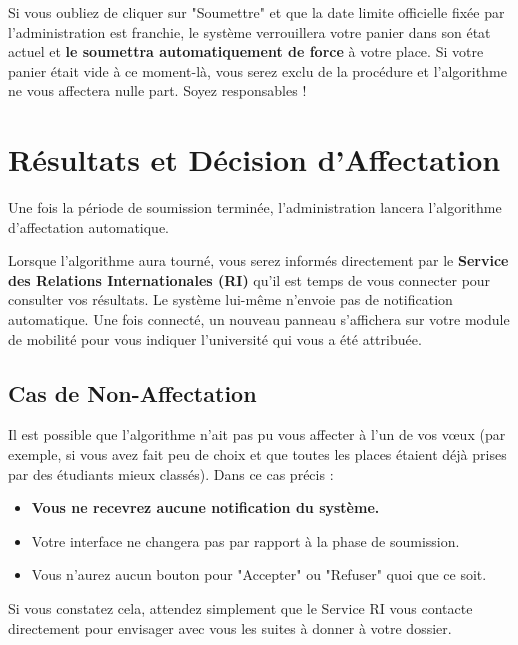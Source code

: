 \documentclass[12pt,a4paper]{article}
\begin{document}
\begin{tcolorbox}[colback=red!5!white,colframe=red!75!black,title=⚠️ CONSÉQUENCE DU RETARD DE SOUMISSION]
Si vous oubliez de cliquer sur "Soumettre" et que la date limite officielle fixée par l'administration est franchie, le système verrouillera votre panier dans son état actuel et \textbf{le soumettra automatiquement de force} à votre place. 
\newline Si votre panier était vide à ce moment-là, vous serez exclu de la procédure et l'algorithme ne vous affectera nulle part. Soyez responsables !
\end{tcolorbox}

\section{Résultats et Décision d'Affectation}
Une fois la période de soumission terminée, l'administration lancera l'algorithme d'affectation automatique.

Lorsque l'algorithme aura tourné, vous serez informés directement par le \textbf{Service des Relations Internationales (RI)} qu'il est temps de vous connecter pour consulter vos résultats. Le système lui-même n'envoie pas de notification automatique. Une fois connecté, un nouveau panneau s'affichera sur votre module de mobilité pour vous indiquer l'université qui vous a été attribuée.

\subsection{Cas de Non-Affectation}
Il est possible que l'algorithme n'ait pas pu vous affecter à l'un de vos vœux (par exemple, si vous avez fait peu de choix et que toutes les places étaient déjà prises par des étudiants mieux classés). 
\newline Dans ce cas précis :
\begin{itemize}
    \item \textbf{Vous ne recevrez aucune notification du système.}
    \item Votre interface ne changera pas par rapport à la phase de soumission.
    \item Vous n'aurez aucun bouton pour "Accepter" ou "Refuser" quoi que ce soit.
\end{itemize}
Si vous constatez cela, attendez simplement que le Service RI vous contacte directement pour envisager avec vous les suites à donner à votre dossier.
\end{document}
